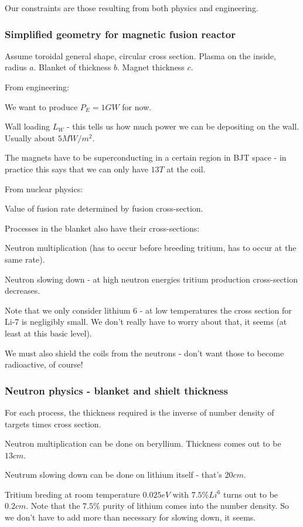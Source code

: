 \documentclass[PlasmaNotes.tex]{subfiles}
\begin{document}
Our constraints are those resulting from both physics and engineering.

\subsubsection{Simplified geometry for magnetic fusion reactor}

Assume toroidal general shape, circular cross section. Plasma on the inside, radius $a$. Blanket of thickness $b$. Magnet thickness $c$.

From engineering:

We want to produce $P_E=1GW$ for now.

Wall loading $L_W$ - this tells us how much power we can be depositing on the wall. Usually about $5 MW/m^2$.

The magnets have to be superconducting in a certain region in BJT space - in practice this says that we can only have $13 T$ at the coil.


From nuclear physics:

Value of fusion rate determined by fusion cross-section.

Processes in the blanket also have their cross-sections:

Neutron multiplication (has to occur before breeding tritium, has to occur at the same rate).

Neutron slowing down - at high neutron energies tritium production cross-section decreases.

Note that we only consider lithium 6 - at low temperatures the cross section for Li-7 is negligibly small. We don't really have to worry about that, it seems (at least at this basic level).

We must also shield the coils from the neutrons - don't want those to become radioactive, of course!

\subsubsection{Neutron physics - blanket and shielt thickness}

For each process, the thickness required is the inverse of number density of targets times cross section.

Neutron multiplication can be done on beryllium. Thickness comes out to be $13 cm$.

Neutrum slowing down can be done on lithium itself - that's $20 cm$.

Tritium breding at room temperature $0.025 eV$ with $7.5\% Li^6$ turns out to be $0.2 cm$. Note that the $7.5\%$ purity of lithium comes into the number density. So we don't have to add more than necessary for slowing down, it seems.
\end{document}
